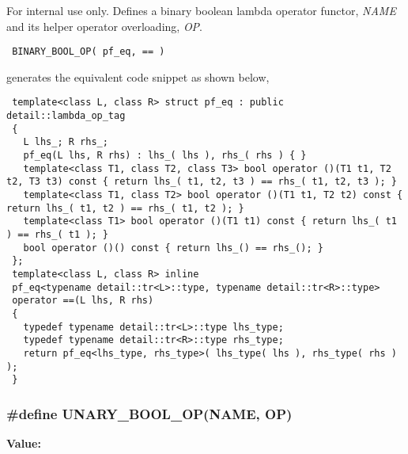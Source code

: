 \begin{Desc}
\item[For internal use only.]
Defines a binary boolean lambda operator functor, {\em NAME\/} and its helper operator overloading, {\em OP\/}.



\begin{Code}\begin{verbatim} BINARY_BOOL_OP( pf_eq, == ) 
\end{verbatim}\end{Code}



generates the equivalent code snippet as shown below,



\begin{Code}\begin{verbatim} template<class L, class R> struct pf_eq : public detail::lambda_op_tag
 {
   L lhs_; R rhs_;
   pf_eq(L lhs, R rhs) : lhs_( lhs ), rhs_( rhs ) { }
   template<class T1, class T2, class T3> bool operator ()(T1 t1, T2 t2, T3 t3) const { return lhs_( t1, t2, t3 ) == rhs_( t1, t2, t3 ); }
   template<class T1, class T2> bool operator ()(T1 t1, T2 t2) const { return lhs_( t1, t2 ) == rhs_( t1, t2 ); }
   template<class T1> bool operator ()(T1 t1) const { return lhs_( t1 ) == rhs_( t1 ); }
   bool operator ()() const { return lhs_() == rhs_(); }
 };
 template<class L, class R> inline
 pf_eq<typename detail::tr<L>::type, typename detail::tr<R>::type>
 operator ==(L lhs, R rhs)
 {
   typedef typename detail::tr<L>::type lhs_type;
   typedef typename detail::tr<R>::type rhs_type;
   return pf_eq<lhs_type, rhs_type>( lhs_type( lhs ), rhs_type( rhs ) );
 }
\end{verbatim}\end{Code}

 \end{Desc}
\subsubsection{\setlength{\rightskip}{0pt plus 5cm}\#define UNARY\_\-BOOL\_\-OP(NAME, OP)}\label{lambda_8hpp_ef5d1af95ba871af311cd9c537d8df73}


\textbf{Value:}

